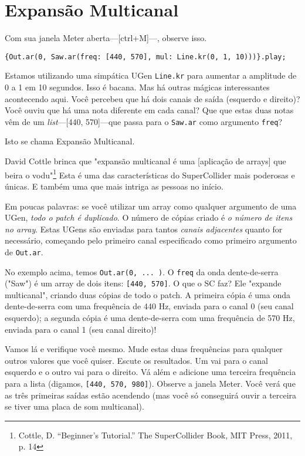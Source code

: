 \section{Expansão Multicanal}

Com sua janela Meter aberta---[ctrl+M]---, observe isso.

\begin{lstlisting}[style=SuperCollider-IDE, basicstyle=\scttfamily\footnotesize]
{Out.ar(0, Saw.ar(freq: [440, 570], mul: Line.kr(0, 1, 10)))}.play;
\end{lstlisting}

Estamos utilizando uma simpática UGen \texttt{Line.kr} para aumentar a amplitude de 0 a 1 em 10 segundos. Isso é bacana. Mas há outras mágicas interessantes acontecendo aqui. Você percebeu que há dois canais de saída (esquerdo e direito)? Você ouviu que há uma nota diferente em cada canal? Que que estas duas notas vêm de um \emph{list}---[440, 570]---que passa para o \texttt{Saw.ar} como argumento \texttt{freq}?

Isto se chama Expansão Multicanal.

David Cottle brinca que "expansão multicanal é uma [aplicação de arrays] que beira o vodu"\footnote{Cottle, D. ``Beginner's Tutorial.'' The SuperCollider Book, MIT Press, 2011, p. 14} Esta é uma das características do SuperCollider mais poderosas e únicas. E também uma que mais intriga as pessoas no início.

Em poucas palavras: se você utilizar um array como qualquer argumento de uma UGen, \emph{todo o patch é duplicado}. O número de cópias criado é \textit{o número de itens no array}. Estas UGens são enviadas para tantos \textit{canais adjacentes} quanto for necessário, começando pelo primeiro canal especificado como primeiro argumento de \texttt{Out.ar}.

No exemplo acima, temos \texttt{Out.ar(0, ... )}. O \texttt{freq} da onda dente-de-serra ("Saw") é um array de dois itens: \texttt{[440, 570]}. O que o SC faz? Ele "expande multicanal", criando duas cópias de todo o patch. A primeira cópia é uma onda dente-de-serra com uma frequência de 440 Hz, enviada para o canal 0 (seu canal esquerdo); a segunda cópia é uma dente-de-serra com uma frequência de 570 Hz, enviada para o canal 1 (seu canal direito)!

Vamos lá e verifique você mesmo. Mude estas duas frequências para qualquer outros valores que você quiser. Escute os resultados. Um vai para o canal esquerdo e o outro vai para o direito. Vá além e adicione uma terceira frequência para a lista (digamos, \texttt{[440, 570, 980]}). Observe a janela Meter. Você verá que as três primeiras saídas estão acendendo (mas você só conseguirá ouvir a terceira se tiver uma placa de som multicanal).

